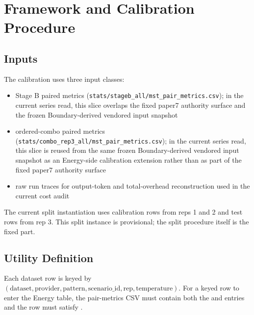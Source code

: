 \documentclass[11pt,a4paper]{article}
\begin{document}
\section{Framework and Calibration Procedure}
\label{sec:framework}

\subsection{Inputs}
\label{sec:inputs}

The calibration uses three input classes:
\begin{itemize}
  \item Stage B paired metrics (\texttt{stats/stageb\_all/mst\_pair\_metrics.csv}); in the current series read, this slice overlaps the fixed paper7 authority surface and the frozen Boundary-derived vendored input snapshot
  \item ordered-combo paired metrics (\texttt{stats/combo\_rep3\_all/mst\_pair\_metrics.csv}); in the current series read, this slice is reused from the same frozen Boundary-derived vendored input snapshot as an Energy-side calibration extension rather than as part of the fixed paper7 authority surface
  \item raw run traces for output-token and total-overhead reconstruction used in the current cost audit
\end{itemize}

The current split instantiation uses calibration rows from reps 1 and 2 and test rows from rep 3. This split instance is provisional; the split procedure itself is the fixed part.

\subsection{Utility Definition}
\label{sec:utility}

Each dataset row is keyed by
\((\mathrm{dataset}, \mathrm{provider}, \mathrm{pattern}, \mathrm{scenario\_id}, \mathrm{rep}, \mathrm{temperature})\).
For a keyed row to enter the Energy table, the pair-metrics CSV must contain both
the  and  entries and
the row must satisfy .
\end{document}

